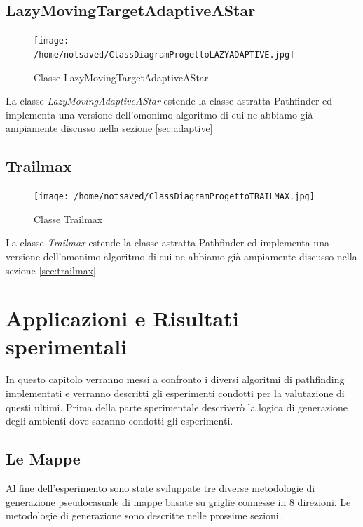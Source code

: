 \documentclass[11pt]{book}
\begin{document}
\section{LazyMovingTargetAdaptiveAStar}
\begin{figure}[H]
\centering
\texttt{[image: /home/notsaved/ClassDiagramProgettoLAZYADAPTIVE.jpg]}
\caption{Classe LazyMovingTargetAdaptiveAStar}
\label{classlazyadaptive}
\end{figure}



La classe \emph{LazyMovingAdaptiveAStar} estende la classe astratta Pathfinder ed implementa una versione dell'omonimo algoritmo di cui ne abbiamo gi\`a ampiamente discusso nella sezione \ref{sec:adaptive}

\section{Trailmax}

\begin{figure}[H]
\centering
\texttt{[image: /home/notsaved/ClassDiagramProgettoTRAILMAX.jpg]}
\caption{Classe Trailmax}
\label{classtrailmax}
\end{figure}

La classe \emph{Trailmax} estende la classe astratta Pathfinder ed implementa una versione dell'omonimo algoritmo di cui ne abbiamo gi\`a ampiamente discusso nella sezione \ref{sec:trailmax}

\chapter{Applicazioni e Risultati sperimentali}

\par{In questo capitolo verranno messi a confronto i diversi algoritmi di pathfinding implementati e verranno descritti gli esperimenti condotti per la valutazione di questi ultimi. Prima della parte sperimentale descriver\`o la logica di generazione degli ambienti dove saranno condotti gli esperimenti.
}

\section{Le Mappe}

Al fine dell'esperimento sono state sviluppate tre diverse metodologie di generazione pseudocasuale di mappe basate su griglie connesse in 8 direzioni. Le metodologie di generazione sono descritte nelle prossime sezioni.
\end{document}
